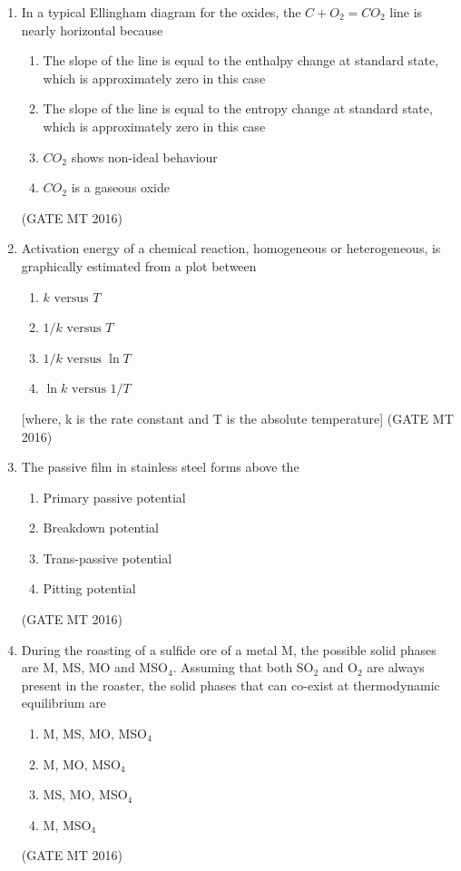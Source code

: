 \documentclass[journal, 11pt, onecolumn]{IEEEtran}
\theoremstyle{remark}
\begin{document}
\begin{enumerate}
\item In a typical Ellingham diagram for the oxides, the $C + O_2 = CO_2$ line is nearly horizontal because
\begin{enumerate}
\item The slope of the line is equal to the enthalpy change at standard state, which is approximately zero in this case
\item The slope of the line is equal to the entropy change at standard state, which is approximately zero in this case
\item $CO_2$ shows non-ideal behaviour
\item $CO_2$ is a gaseous oxide
\end{enumerate}
\hfill(GATE MT 2016)

\item Activation energy of a chemical reaction, homogeneous or heterogeneous, is graphically estimated from a plot between
\begin{enumerate}
\item $k \text{ versus } T$
\item $1/k \text{ versus } T$
\item $1/k \text{ versus } \ln T$
\item $\ln k \text{ versus } 1/T$
\end{enumerate}
[where, k is the rate constant and T is the absolute temperature]
\hfill(GATE MT 2016)

\item The passive film in stainless steel forms above the
\begin{enumerate}
\item Primary passive potential
\item Breakdown potential
\item Trans-passive potential
\item Pitting potential
\end{enumerate}
\hfill(GATE MT 2016)

\item During the roasting of a sulfide ore of a metal M, the possible solid phases are M, MS, MO and MSO$_4$. Assuming that both SO$_2$ and O$_2$ are always present in the roaster, the solid phases that can co-exist at thermodynamic equilibrium are
\begin{multicols}{2}
\begin{enumerate}
\item M, MS, MO, MSO$_4$
\item M, MO, MSO$_4$
\item MS, MO, MSO$_4$
\item M, MSO$_4$
\end{enumerate}  
\end{multicols}
\hfill(GATE MT 2016)



\end{enumerate}
\end{document}
